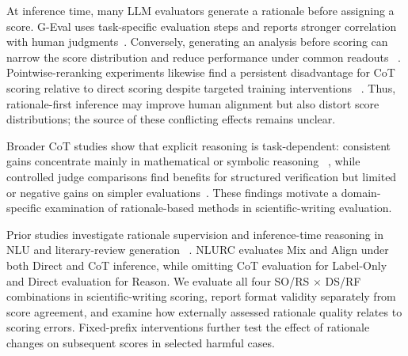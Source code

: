 At inference time, many LLM evaluators generate a rationale before assigning
a score. G-Eval uses task-specific evaluation steps and reports stronger
correlation with human judgments~\citep{liu-etal-2023-g}.
Conversely, generating an analysis before scoring can narrow the score
distribution and reduce performance under common readouts
~\citep{wang-etal-2025-improving-llm-judge}.
Pointwise-reranking experiments likewise find a persistent disadvantage for
CoT scoring relative to direct scoring despite targeted training interventions
~\citep{chen-etal-2026-beyond-polarization}.
Thus, rationale-first inference may improve human alignment but also distort
score distributions; the source of these conflicting effects remains unclear.


Broader CoT studies show that explicit reasoning is task-dependent:
consistent gains concentrate mainly in mathematical or symbolic reasoning
~\citep{sprague-etal-2025-cot}, while controlled judge comparisons find
benefits for structured verification but limited or negative gains on simpler
evaluations~\citep{zhang-etal-2026-reasoning-not-free}.
These findings motivate a domain-specific examination of rationale-based
methods in scientific-writing evaluation.


Prior studies investigate rationale supervision and inference-time reasoning
in NLU and literary-review generation
~\citep{shi-etal-2025-investigating,liu-etal-2026-when}.
NLURC evaluates Mix and Align under both Direct and CoT inference, while
omitting CoT evaluation for Label-Only and Direct evaluation for Reason.
We evaluate all four SO/RS $\times$ DS/RF combinations in scientific-writing
scoring, report format validity separately from score agreement, and examine
how externally assessed rationale quality relates to scoring errors.
Fixed-prefix interventions further test the effect of rationale changes on
subsequent scores in selected harmful cases.